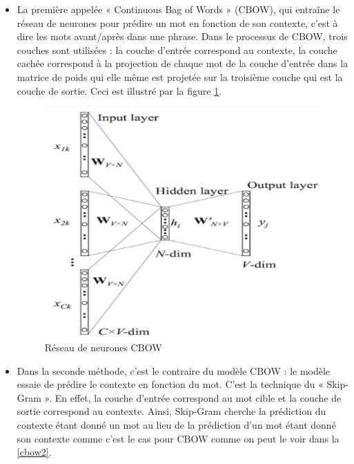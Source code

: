     \begin{itemize}
    \item La première appelée « Continuous Bag of Words » (CBOW), qui entraîne le réseau de neurones pour prédire un mot en fonction de son contexte, c’est à dire les mots avant/après dans une phrase. 
    Dans le processus de CBOW, trois couches sont utilisées : la couche d'entrée correspond au contexte, la couche cachée correspond à la projection de chaque mot de la couche d'entrée dans la matrice de poids qui elle même  est projetée sur la troisième couche qui est la couche de sortie. Ceci est illustré par la figure \ref{cbow1}.
   
        \begin{figure}[H]
            \centering
            \includegraphics[height=250pt,width=300pt]{img/chapter2/Cbow.png}
            \caption{Réseau de neurones CBOW}
            \label{cbow1}
        \end{figure}
        
    
    \item Dans la seconde méthode, c'est le contraire du modèle CBOW : le modèle essaie de prédire le contexte en fonction du mot. C’est la technique du « Skip-Gram ». En effet, la couche d'entrée correspond au mot cible et la couche de sortie correspond au contexte. Ainsi, Skip-Gram cherche la prédiction du contexte étant donné un mot au lieu de la prédiction d'un mot étant donné son contexte comme c'est le cas pour CBOW comme on peut le voir dans la  \autoref{cbow2}.\label{skip-gram}
    

\end{itemize}

